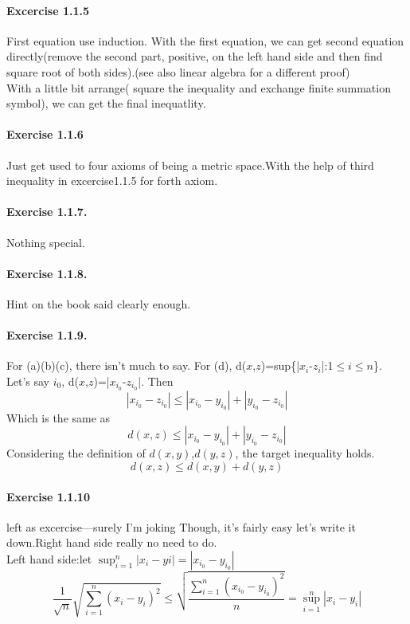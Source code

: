 \paragraph{Excercise 1.1.5}
First equation use induction.
With the first equation, we can get second equation directly(remove the second part, positive, on the left hand side and then find square root of both sides).(see also linear algebra for a different proof)\\
With a little bit arrange( square the inequality and exchange finite summation symbol), we can get the final inequatlity.
\paragraph{Exercise 1.1.6}
Just get used to four axioms of being a metric space.With the help of third inequality in excercise1.1.5 for forth axiom.
\paragraph{Exercise 1.1.7.}
Nothing special.
\paragraph{Exercise 1.1.8.}Hint on the book said clearly enough.
\paragraph{Exercise 1.1.9.}For (a)(b)(c), there isn't much to say. For (d), d($x$,$z$)=sup\{|$x_{i}$-$z_{i}$|:1$\leqslant$$i$$\leqslant$$n$\}. Let's say $i_{0}$, d($x$,$z$)=|$x_{i_{0}}$-$z_{i_{0}}$|. Then\[ |x_{i_{0}}-z_{i_{0}}|\leqslant|x_{i_{0}}-y_{i_{0}}|+|y_{i_{0}}-z_{i_{0}}|
\]
Which is the same as \[d(x,z)
\leqslant|x_{i_{0}}-y_{i_{0}}|+|y_{i_{0}}-z_{i_{0}}|
\]
Considering the definition of $d(x,y)$,$d(y,z)$, the target inequality holds.
\[d(x,z)
\leqslant d(x,y)+d(y,z)\]
\paragraph{Exercise 1.1.10}
left as excercise---surely I'm joking
Though, it's fairly easy let's write it down.Right hand side really no need to do.\\Left hand side:let $\sup_{i=1}^{n}|x_{i}-y{i}|=|x_{i_{0}}-y_{i_{0}}|$\[\frac{1}{\sqrt{n}}\sqrt{\sum_{i=1}^{n}(x_{i}-y_{i})^2}\leq\sqrt{\frac{\sum_{i=1}^{n}(x_{i_{0}}-y_{i_{0}})^2}{n}}=\sup_{i=1}^{n}|x_{i}-y_{i}|\]
